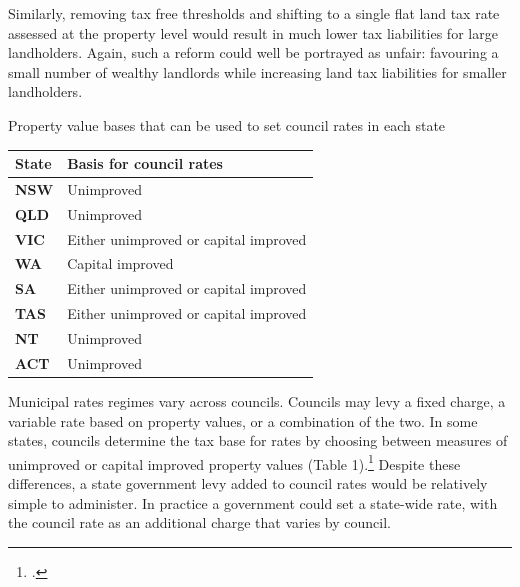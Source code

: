 Similarly, removing tax free thresholds and shifting to a single flat land tax rate assessed at the property level would result in much lower tax liabilities for large landholders. Again, such a reform could well be portrayed as unfair: favouring a small number of wealthy landlords while increasing land tax liabilities for smaller landholders. 

\begin{table}
%
{Property value bases that can be used to set council rates in each state}
\begin{tabularx}{\columnwidth}{>{\bfseries}lX}
\toprule
\textbf{State} & \textbf{Basis for council rates} \\%
\midrule
\textbf{NSW} & Unimproved  \\[0.5\baselineskip]
\textbf{QLD} & Unimproved  \\[0.5\baselineskip]
\textbf{VIC} & Either unimproved or capital improved  \\[0.5\baselineskip]
\textbf{WA} & Capital improved  \\[0.5\baselineskip]
\textbf{SA} & Either unimproved or capital improved \\[0.5\baselineskip]
\textbf{TAS} & Either unimproved or capital improved  \\[0.5\baselineskip]
\textbf{NT} & Unimproved  \\[0.5\baselineskip]
\textbf{ACT} & Unimproved  \\%
\bottomrule
\end{tabularx}

\end{table}

Municipal rates regimes vary across councils. Councils may levy a fixed charge, a variable rate based on property values, or a combination of the two. In some states, councils determine the tax base for rates by choosing between measures of unimproved or capital improved property values (Table 1).\footcite[][198]{productivity2008assessing}  Despite these differences, a state government levy added to council rates would be relatively simple to administer. In practice a government could set a state-wide rate, with the council rate as an additional charge that varies by council.

